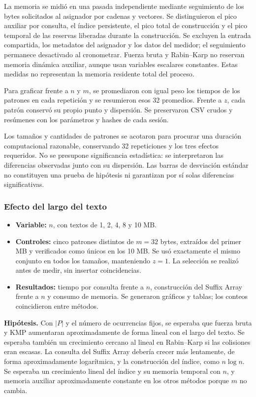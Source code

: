 La memoria se midió en una pasada independiente mediante seguimiento de los
bytes solicitados al asignador por cadenas y vectores. Se distinguieron el pico
auxiliar por consulta, el índice persistente, el pico total de construcción y
el pico temporal de las reservas liberadas durante la construcción. Se excluyen
la entrada compartida, los metadatos del asignador y los datos del medidor; el
seguimiento permanece desactivado al cronometrar. Fuerza bruta y Rabin--Karp no
reservan memoria dinámica auxiliar, aunque usan variables escalares constantes.
Estas medidas no representan la memoria residente total del proceso.

Para graficar frente a \(n\) y \(m\), se promediaron con igual peso los tiempos
de los patrones en cada repetición y se resumieron esos 32 promedios. Frente a
\(z\), cada patrón conservó su propio punto y dispersión. Se preservaron
CSV crudos y resúmenes con los parámetros y hashes de cada sesión.

Los tamaños y cantidades de patrones se acotaron para procurar una duración computacional razonable,
conservando 32 repeticiones y los tres efectos requeridos.
No se presupone significancia estadística: se interpretaron las diferencias
observadas junto con su dispersión. Las barras de desviación estándar no
constituyen una prueba de hipótesis ni garantizan por sí solas diferencias
significativas.

\subsubsection{Efecto del largo del texto}

\begin{itemize}
    \item \textbf{Variable:} \(n\), con textos de 1, 2, 4, 8 y 10 MB.
    \item \textbf{Controles:} cinco patrones distintos de \(m=32\) bytes,
    extraídos del primer MB y verificados como únicos en los 10 MB. Se usó
    exactamente el mismo conjunto en todos los tamaños, manteniendo \(z=1\).
    La selección se realizó antes de medir, sin insertar coincidencias.
    \item \textbf{Resultados:} tiempo por consulta frente a \(n\), construcción
    del Suffix Array frente a \(n\) y consumo de memoria. Se generaron gráficos
    y tablas; los conteos coincidieron entre métodos.
\end{itemize}

\textbf{Hipótesis.} Con \(|P|\) y el número de ocurrencias fijos, se esperaba que
fuerza bruta y KMP aumentaran aproximadamente de forma lineal con el largo del
texto. Se esperaba también un crecimiento cercano al lineal en Rabin--Karp si
las colisiones eran escasas. La consulta del Suffix Array debería crecer más
lentamente, de forma aproximadamente logarítmica, y la construcción del índice,
como \(n\log n\). Se esperaba un crecimiento lineal del índice y su memoria
temporal con \(n\), y memoria auxiliar aproximadamente constante en los otros métodos
porque \(m\) no cambia.

